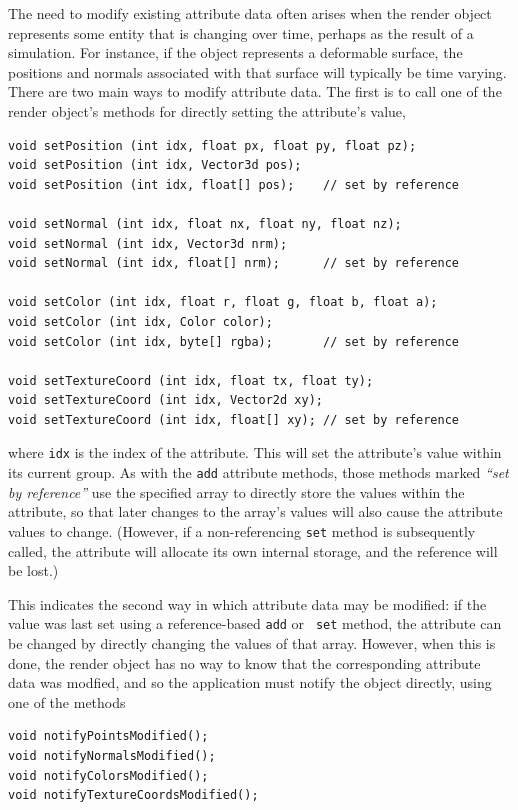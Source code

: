 The need to modify existing attribute data often arises when the
render object represents some entity that is changing over time,
perhaps as the result of a simulation. For instance, if the object
represents a deformable surface, the positions and normals associated
with that surface will typically be time varying.  There are two main
ways to modify attribute data. The first is to call one of the render
object's methods for directly setting the attribute's value,
%
\begin{lstlisting}[]
void setPosition (int idx, float px, float py, float pz);
void setPosition (int idx, Vector3d pos);
void setPosition (int idx, float[] pos);    // set by reference

void setNormal (int idx, float nx, float ny, float nz);
void setNormal (int idx, Vector3d nrm);
void setNormal (int idx, float[] nrm);      // set by reference

void setColor (int idx, float r, float g, float b, float a);
void setColor (int idx, Color color);
void setColor (int idx, byte[] rgba);       // set by reference

void setTextureCoord (int idx, float tx, float ty);
void setTextureCoord (int idx, Vector2d xy);
void setTextureCoord (int idx, float[] xy); // set by reference
\end{lstlisting}
%
where {\tt idx} is the index of the attribute. This will set the
attribute's value within its current group.  As with the {\tt add}
attribute methods, those methods marked {\it ``set by reference''} use
the specified array to directly store the values within the attribute,
so that later changes to the array's values will also cause the
attribute values to change. (However, if a non-referencing {\tt set} method is
subsequently called, the attribute will allocate its own internal
storage, and the reference will be lost.)

This indicates the second way in which attribute data may be modified:
if the value was last set using a reference-based {\tt add} or {\tt
set} method, the attribute can be changed by directly changing the
values of that array. However, when this is done, the render object
has no way to know that the corresponding attribute data was modfied,
and so the application must notify the object directly, using one of
the methods
%
\begin{lstlisting}[]
void notifyPointsModified();
void notifyNormalsModified();
void notifyColorsModified();
void notifyTextureCoordsModified();
\end{lstlisting}
%


